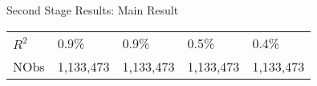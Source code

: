 \documentclass{beamer}
\begin{document}
\begin{frame}{Second Stage Results: Main Result}
{\begin{tabular}{l*{4}{l}}
            \(R^{2}\)          & 0.9\%                            & 0.9\%                           & 0.5\%     & 0.4\%     \\
            NObs               & 1,133,473                        & 1,133,473                       & 1,133,473 & 1,133,473 \\
            \bottomrule
        \end{tabular}
    }

\end{frame}




\end{document}
